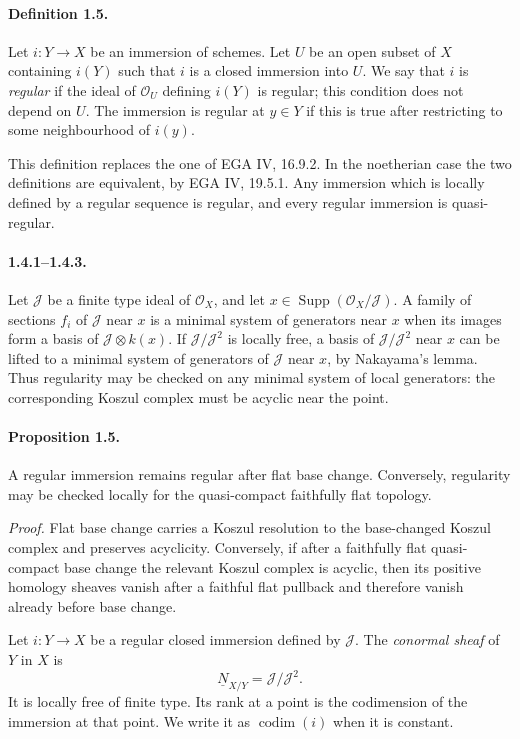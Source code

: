 \documentclass[12pt]{article}
\newcommand{\cO}{\mathcal O}
\newcommand{\cJ}{\mathcal J}
\newcommand{\Supp}{\operatorname{Supp}}
\newcommand{\codim}{\operatorname{codim}}
\begin{document}
\paragraph{Definition 1.5.} Let $i:Y\to X$ be an immersion of schemes. Let $U$ be an open subset of $X$ containing $i(Y)$ such that $i$ is a closed immersion into $U$. We say that $i$ is \emph{regular} if the ideal of $\cO_U$ defining $i(Y)$ is regular; this condition does not depend on $U$. The immersion is regular at $y\in Y$ if this is true after restricting to some neighbourhood of $i(y)$.

This definition replaces the one of EGA IV, 16.9.2. In the noetherian case the two definitions are equivalent, by EGA IV, 19.5.1. Any immersion which is locally defined by a regular sequence is regular, and every regular immersion is quasi-regular.

\paragraph{1.4.1--1.4.3.} Let $\cJ$ be a finite type ideal of $\cO_X$, and let $x\in\Supp(\cO_X/\cJ)$. A family of sections $f_i$ of $\cJ$ near $x$ is a minimal system of generators near $x$ when its images form a basis of $\cJ\otimes k(x)$. If $\cJ/\cJ^2$ is locally free, a basis of $\cJ/\cJ^2$ near $x$ can be lifted to a minimal system of generators of $\cJ$ near $x$, by Nakayama's lemma. Thus regularity may be checked on any minimal system of local generators: the corresponding Koszul complex must be acyclic near the point.

\paragraph{Proposition 1.5.} A regular immersion remains regular after flat base change. Conversely, regularity may be checked locally for the quasi-compact faithfully flat topology.

\emph{Proof.} Flat base change carries a Koszul resolution to the base-changed Koszul complex and preserves acyclicity. Conversely, if after a faithfully flat quasi-compact base change the relevant Koszul complex is acyclic, then its positive homology sheaves vanish after a faithful flat pullback and therefore vanish already before base change.

Let $i:Y\to X$ be a regular closed immersion defined by $\cJ$. The \emph{conormal sheaf} of $Y$ in $X$ is
\[
\underline N_{X/Y}=\cJ/\cJ^2.
\]
It is locally free of finite type. Its rank at a point is the codimension of the immersion at that point. We write it as $\codim(i)$ when it is constant.
\end{document}
